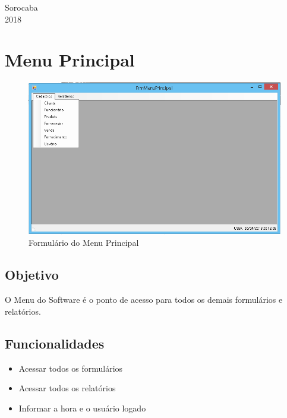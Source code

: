 \documentclass[
	article,			%
	12pt,				%
	oneside,			%
	a4paper,			%
	english,			%
	brazil,				%
	sumario=tradicional
	]{abntex2}
\begin{document}
	\frenchspacing
	
	\begin{folhaderosto}
		\centering
		\maketitle
		\vfill
		{Sorocaba\\2018}
	\end{folhaderosto}
	
	\newpage
	\tableofcontents
	
	\newpage
	\section{Menu Principal}
		\begin{figure}[!htb]
			\centering
			\includegraphics[scale=0.7]{./Figuras/FrmMenu.png}
			\caption{Formulário do Menu Principal}
		\end{figure}
		\subsection{Objetivo}
		O Menu do Software é o ponto de acesso para todos os demais formulários e relatórios.
		\subsection{Funcionalidades}
			\begin{itemize}
				\item Acessar todos os formulários
				\item Acessar todos os relatórios
				\item Informar a hora e o usuário logado
		    \end{itemize}
\end{document}
